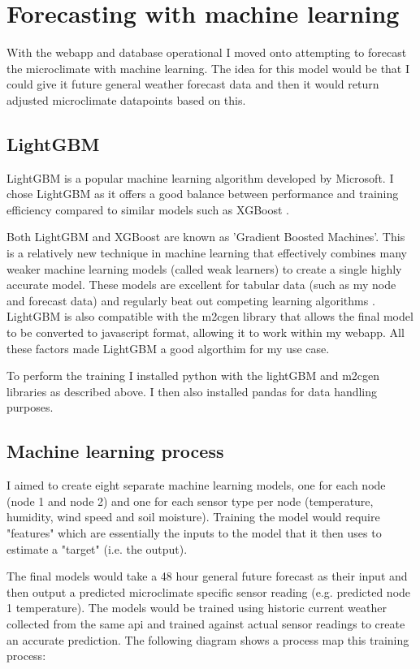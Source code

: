 \section{Forecasting with machine learning}

With the webapp and database operational I moved onto attempting to forecast the
microclimate with machine learning. The idea for this model would be that I
could give it future general weather forecast data and then it would return
adjusted microclimate datapoints based on this.


\subsection{LightGBM}

LightGBM is a popular machine learning algorithm developed by Microsoft. I chose
LightGBM as it offers a good balance between performance and training efficiency
compared to similar models such as XGBoost \cite{saha2025}.

Both LightGBM and XGBoost are known as 'Gradient Boosted Machines'. This is a
relatively new technique in machine learning that effectively combines many
weaker machine learning models (called weak learners) to create a single highly
accurate model. These models are excellent for tabular data (such as my node and
forecast data) and regularly beat out competing learning algorithms
\cite{tuychiev2023}. LightGBM is also compatible with the m2cgen library that
allows the final model to be converted to javascript format, allowing it to work
within my webapp. All these factors made LightGBM a good algorthim for my use
case.

To perform the training I installed python with the lightGBM  and m2cgen
libraries as described above. I then also installed pandas for data handling
purposes.

\subsection{Machine learning process}

I aimed to create eight separate machine learning models, one for each node
(node 1 and node 2) and one for each sensor type per node (temperature,
humidity, wind speed and soil moisture). Training the model would require
"features" which are essentially the inputs to the model that it then uses to
estimate a "target" (i.e. the output).

The final models would take a 48 hour general future forecast as their input and
then output a predicted microclimate specific sensor reading (e.g. predicted
node 1 temperature). The models would be trained using historic current weather
collected from the same api and trained against actual sensor readings to create
an accurate prediction. The following diagram shows a process map this training
process:

